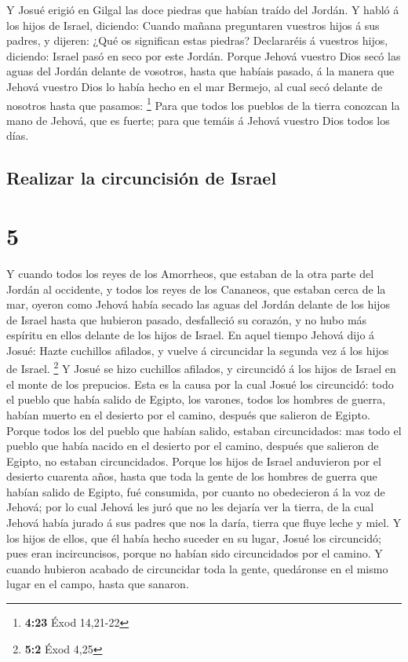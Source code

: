  Y Josué erigió en Gilgal las doce piedras que habían
traído del Jordán.  Y habló á los hijos de Israel,
diciendo: Cuando mañana preguntaren vuestros hijos á sus padres, y
dijeren: ¿Qué os significan estas piedras?  Declararéis á
vuestros hijos, diciendo: Israel pasó en seco por este Jordán.
 Porque Jehová vuestro Dios secó las aguas del Jordán
delante de vosotros, hasta que habíais pasado, á la manera que Jehová
vuestro Dios lo había hecho en el mar Bermejo, al cual secó delante de
nosotros hasta que pasamos: \footnote{\textbf{4:23} Éxod 14,21-22}
 Para que todos los pueblos de la tierra conozcan la mano
de Jehová, que es fuerte; para que temáis á Jehová vuestro Dios todos
los días.

\hypertarget{realizar-la-circuncisiuxf3n-de-israel}{%
\subsection{Realizar la circuncisión de
Israel}\label{realizar-la-circuncisiuxf3n-de-israel}}

\hypertarget{section-4}{%
\section{5}\label{section-4}}

 Y cuando todos los reyes de los Amorrheos, que estaban de
la otra parte del Jordán al occidente, y todos los reyes de los
Cananeos, que estaban cerca de la mar, oyeron como Jehová había secado
las aguas del Jordán delante de los hijos de Israel hasta que hubieron
pasado, desfalleció su corazón, y no hubo más espíritu en ellos delante
de los hijos de Israel.  En aquel tiempo Jehová dijo á
Josué: Hazte cuchillos afilados, y vuelve á circuncidar la segunda vez á
los hijos de Israel. \footnote{\textbf{5:2} Éxod 4,25}  Y
Josué se hizo cuchillos afilados, y circuncidó á los hijos de Israel en
el monte de los prepucios.  Esta es la causa por la cual
Josué los circuncidó: todo el pueblo que había salido de Egipto, los
varones, todos los hombres de guerra, habían muerto en el desierto por
el camino, después que salieron de Egipto.  Porque todos los
del pueblo que habían salido, estaban circuncidados: mas todo el pueblo
que había nacido en el desierto por el camino, después que salieron de
Egipto, no estaban circuncidados.  Porque los hijos de
Israel anduvieron por el desierto cuarenta años, hasta que toda la gente
de los hombres de guerra que habían salido de Egipto, fué consumida, por
cuanto no obedecieron á la voz de Jehová; por lo cual Jehová les juró
que no les dejaría ver la tierra, de la cual Jehová había jurado á sus
padres que nos la daría, tierra que fluye leche y miel.  Y
los hijos de ellos, que él había hecho suceder en su lugar, Josué los
circuncidó; pues eran incircuncisos, porque no habían sido circuncidados
por el camino.  Y cuando hubieron acabado de circuncidar
toda la gente, quedáronse en el mismo lugar en el campo, hasta que
sanaron.

